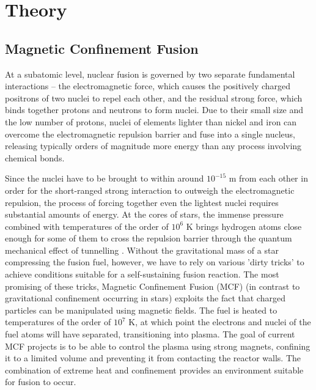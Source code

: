 \chapter{Theory}

\section{Magnetic Confinement Fusion}
At a subatomic level, nuclear fusion is governed by two separate fundamental interactions -- the electromagnetic force, which causes the positively charged positrons of two nuclei to repel each other, and the residual strong force, which binds together protons and neutrons to form nuclei. 
Due to their small size and the low number of protons, nuclei of elements lighter than nickel and iron can overcome the electromagnetic repulsion barrier and fuse into a single nucleus, releasing typically orders of magnitude more energy than any process involving chemical bonds.

Since the nuclei have to be brought to within around $10^{-15}$ m from each other in order for the short-ranged strong interaction to outweigh the electromagnetic repulsion, the process of forcing together even the lightest nuclei requires substantial amounts of energy.  
At the cores of stars, the immense pressure combined with temperatures of the order of $10^6$ K brings hydrogen atoms close enough for some of them to cross the repulsion barrier through the quantum mechanical effect of tunnelling \cite{clayton1983principles}.
Without the gravitational mass of a star compressing the fusion fuel, however, we have to rely on various 'dirty tricks' to achieve conditions suitable for a self-sustaining fusion reaction. 
The most promising of these tricks, Magnetic Confinement Fusion (MCF) (in contrast to gravitational confinement occurring in stars) exploits the fact that charged particles can be manipulated using magnetic fields. 
The fuel is heated to temperatures of the order of $10^7$ K, at which point the electrons and nuclei of the fuel atoms will have separated, transitioning into plasma. 
The goal of current MCF projects is to be able to control the plasma using strong magnets, confining it to a limited volume and preventing it from contacting the reactor walls.
The combination of extreme heat and confinement provides an environment suitable for fusion to occur.

